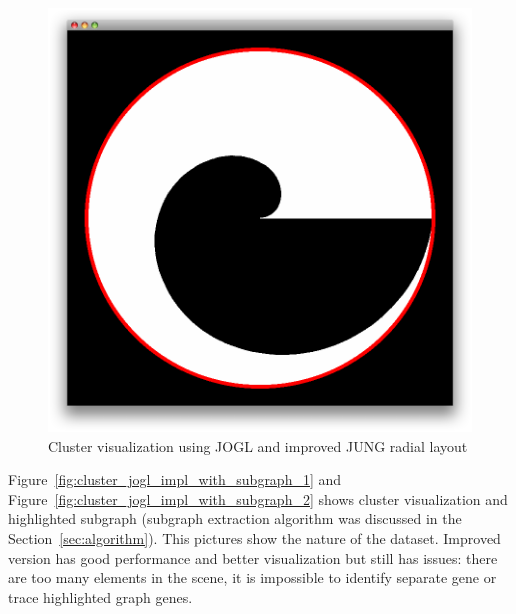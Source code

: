 \begin{figure}[h!]
\centering
\includegraphics[scale=0.4]{pictures/cluster_jogl_impl.png}
\caption{Cluster visualization using JOGL and improved JUNG radial layout}
\label{fig:cluster_jogl_impl}
\end{figure}


Figure~\ref{fig:cluster_jogl_impl_with_subgraph_1} and Figure~\ref{fig:cluster_jogl_impl_with_subgraph_2} shows cluster visualization and highlighted subgraph (subgraph extraction algorithm was discussed in the Section~\ref{sec:algorithm}). This pictures show the nature of the dataset. Improved version has good performance and better visualization but still has issues: there are too many elements in the scene, it is impossible to identify separate gene or trace highlighted graph genes.


